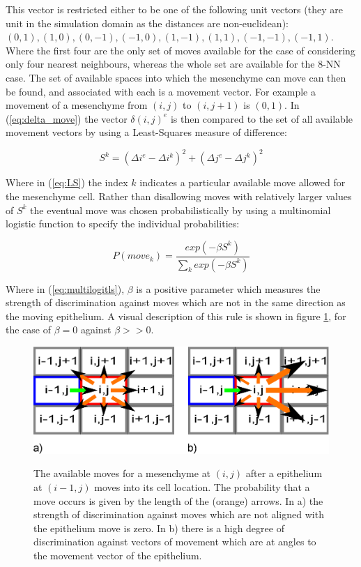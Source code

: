 \documentclass[pdftex,10pt,a4paper]{article}
\begin{document}
This vector is restricted either to be one of the following unit vectors (they are unit in the simulation domain as the distances are non-euclidean): $(0,1),(1,0),(0,-1),(-1,0),(1,-1),(1,1),(-1,-1),(-1,1)$. Where the first four are the only set of moves available for the case of considering only four nearest neighbours, whereas the whole set are available for the 8-NN case. The set of available spaces into which the mesenchyme can move can then be found, and associated with each is a movement vector. For example a movement of a mesenchyme from $(i,j)$ to $(i,j+1)$ is $(0,1)$.
In (\ref{eq:delta_move}) the vector $\delta(i,j)^e$ is then compared to the set of all available movement vectors by using a Least-Squares measure of difference:

\begin{equation}\label{eq:LS}
S^k = (\Delta i^e - \Delta i^k)^2 + (\Delta j^e - \Delta j^k)^2
\end{equation}

Where in (\ref{eq:LS}) the index $k$ indicates a particular available move allowed for the mesenchyme cell. Rather than disallowing moves with relatively larger values of $S^k$ the eventual move was chosen probabilistically by using a multinomial logistic function to specify the individual probabilities:

\begin{equation} \label{eq:multilogitls}
P(move_k) = \frac{exp(-\beta S^k)}{\sum\limits_{k} exp(-\beta S^k)}
\end{equation}

Where in (\ref{eq:multilogitls}), $\beta$ is a positive parameter which measures the strength of discrimination against moves which are not in the same direction as the moving epithelium. A visual description of this rule is shown in figure \ref{fig:arrows}, for the case of $\beta=0$ against $\beta>>0$.

\begin{figure}[ht] 
\centering
\scalebox{0.5} 
{\includegraphics{weighting.eps}}
\caption{The available moves for a mesenchyme at $(i,j)$ after a epithelium at $(i-1,j)$ moves into its cell location. The probability that a move occurs is given by the length of the (orange) arrows. In a) the strength of discrimination against moves which are not aligned with the epithelium move is zero. In b) there is a high degree of discrimination against vectors of movement which are at angles to the movement vector of the epithelium.}\label{fig:arrows}
\end{figure} 
\end{document}
